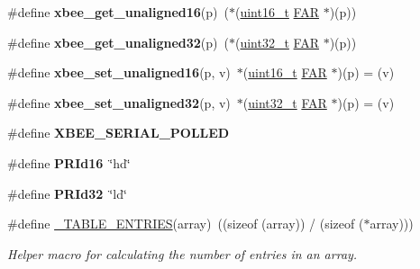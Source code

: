 \begin{DoxyCompactItemize}
\#define {\bfseries xbee\+\_\+get\+\_\+unaligned16}(p)~($\ast$(\hyperlink{group__hal__dos_ga5a8b2dc9e45a9ee81a94ef304fb62505}{uint16\+\_\+t} \hyperlink{group__hal_gaef060b3456fdcc093a7210a762d5f2ed}{F\+AR} $\ast$)(p))
\item 
\mbox{\label{group__hal_ga05636feff360b2e024a0db267aedf104}} 
\#define {\bfseries xbee\+\_\+get\+\_\+unaligned32}(p)~($\ast$(\hyperlink{group__hal__dos_ga09a1e304d66d35dd47daffee9731edaa}{uint32\+\_\+t} \hyperlink{group__hal_gaef060b3456fdcc093a7210a762d5f2ed}{F\+AR} $\ast$)(p))
\item 
\mbox{\label{group__hal_gae93bd4533f7f7e0dd4cbc54d2760030e}} 
\#define {\bfseries xbee\+\_\+set\+\_\+unaligned16}(p,  v)~$\ast$(\hyperlink{group__hal__dos_ga5a8b2dc9e45a9ee81a94ef304fb62505}{uint16\+\_\+t} \hyperlink{group__hal_gaef060b3456fdcc093a7210a762d5f2ed}{F\+AR} $\ast$)(p) = (v)
\item 
\mbox{\label{group__hal_gac083bd862aa3f6258437adba422de4ce}} 
\#define {\bfseries xbee\+\_\+set\+\_\+unaligned32}(p,  v)~$\ast$(\hyperlink{group__hal__dos_ga09a1e304d66d35dd47daffee9731edaa}{uint32\+\_\+t} \hyperlink{group__hal_gaef060b3456fdcc093a7210a762d5f2ed}{F\+AR} $\ast$)(p) = (v)
\item 
\mbox{\label{group__hal_ga9bc39fa696de31976b60b54c9b8e62aa}} 
\#define {\bfseries X\+B\+E\+E\+\_\+\+S\+E\+R\+I\+A\+L\+\_\+\+P\+O\+L\+L\+ED}
\item 
\mbox{\label{group__hal_ga087e50fe0283aacc71d7138d13e91939}} 
\#define {\bfseries P\+R\+Id16}~\char`\"{}hd\char`\"{}
\item 
\mbox{\label{group__hal_ga6d94d1417e1b35c53aee6306590de72b}} 
\#define {\bfseries P\+R\+Id32}~\char`\"{}ld\char`\"{}
\item 
\mbox{\label{group__hal_ga2fb602f8a5b3533a57c2c4b92f248569}} 
\#define \hyperlink{group__hal_ga2fb602f8a5b3533a57c2c4b92f248569}{\+\_\+\+T\+A\+B\+L\+E\+\_\+\+E\+N\+T\+R\+I\+ES}(array)~((sizeof (array)) / (sizeof ($\ast$array)))
\begin{DoxyCompactList}\small\item\em Helper macro for calculating the number of entries in an array. \end{DoxyCompactList}\item 

\end{DoxyCompactItemize}
